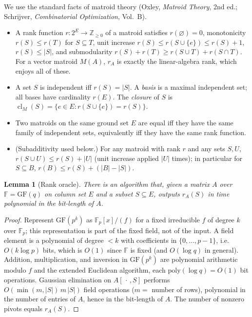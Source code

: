 \documentclass{amsart}
\theoremstyle{plain}
\newtheorem{lemma}{Lemma}
\theoremstyle{definition}
\DeclareMathOperator{\cl}{cl}
\newcommand{\F}{\mathbb{F}}
\begin{document}
We use the standard facts of matroid theory (Oxley, \emph{Matroid Theory}, 2nd ed.; Schrijver,
\emph{Combinatorial Optimization}, Vol.~B).

\begin{itemize}
\item A rank function $r:2^E\to\mathbb Z_{\ge0}$ of a matroid satisfies $r(\varnothing)=0$,
monotonicity $r(S)\le r(T)$ for $S\subseteq T$, unit increase $r(S)\le r(S\cup\{e\})\le r(S)+1$,
$r(S)\le|S|$, and submodularity $r(S)+r(T)\ge r(S\cup T)+r(S\cap T)$. For a vector matroid $M(A)$,
$r_A$ is exactly the linear-algebra rank, which enjoys all of these.

\item A set $S$ is independent iff $r(S)=|S|$. A \emph{basis} is a maximal independent set;
all bases have cardinality $r(E)$. The \emph{closure} of $S$ is
$\cl_M(S)=\{e\in E: r(S\cup\{e\})=r(S)\}$.

\item Two matroids on the same ground set $E$ are equal iff they have the same family of
independent sets, equivalently iff they have the same rank function.

\item (Subadditivity used below.) For any matroid with rank $r$ and any sets $S,U$,
$r(S\cup U)\le r(S)+|U|$ (unit increase applied $|U|$ times); in particular for $S\subseteq B$,
$r(B)\le r(S)+(|B|-|S|)$.
\end{itemize}

\begin{lemma}[Rank oracle]\label{lem:oracle}
There is an algorithm that, given a matrix $A$ over $\F=\mathrm{GF}(q)$ on column set $E$ and a
subset $S\subseteq E$, outputs $r_A(S)$ in time polynomial in the bit-length of $A$.
\end{lemma}

\begin{proof}
Represent $\mathrm{GF}(p^k)$ as $\mathbb F_p[x]/(f)$ for a fixed irreducible $f$ of degree $k$
over $\mathbb F_p$; this representation is part of the fixed field, not of the input. A field
element is a polynomial of degree $<k$ with coefficients in $\{0,\dots,p-1\}$, i.e.
$O(k\log p)$ bits, which is $O(1)$ since $\F$ is fixed (and $O(\log q)$ in general). Addition,
multiplication, and inversion in $\mathrm{GF}(p^k)$ are polynomial arithmetic modulo $f$ and the
extended Euclidean algorithm, each $\mathrm{poly}(\log q)=O(1)$ bit operations. Gaussian
elimination on $A[\,\cdot\,,S]$ performs $O\!\left(\min(m,|S|)\,m\,|S|\right)$ field operations
($m=$ number of rows), polynomial in the number of entries of $A$, hence in the bit-length of
$A$. The number of nonzero pivots equals $r_A(S)$. \qedhere
\end{proof}
\end{document}
